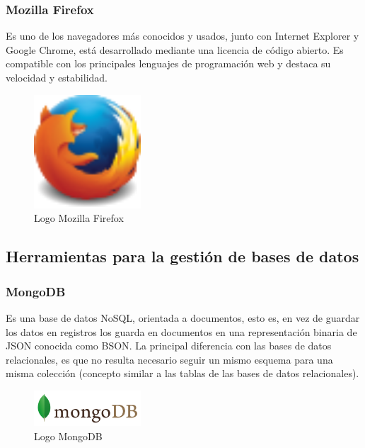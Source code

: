 		\subsubsection{Mozilla Firefox}		
		Es uno de los navegadores más conocidos y usados, junto con Internet Explorer y Google Chrome, está desarrollado mediante una licencia de código abierto.
		Es compatible con los principales lenguajes de programación web y destaca su velocidad y estabilidad.

		\begin{figure}[H]
		\centering
		\includegraphics[width=40mm, fbox={\fboxrule} 4mm]{images/04-metodo/38-firefox_logo}
		\caption{Logo Mozilla Firefox}
		\label{fig:firefox-logo}
		\end{figure}
		
	\subsection{Herramientas para la gestión de bases de datos}
		\subsubsection{MongoDB}
		Es una base de datos NoSQL, orientada a documentos, esto es, en vez de guardar los datos en registros los guarda en documentos en una representación binaria de \ac{JSON} conocida como \ac{BSON}. La principal diferencia con las bases de datos relacionales, es que no resulta necesario seguir un mismo esquema para una misma colección (concepto similar a las tablas de las bases de datos relacionales).
		
		\begin{figure}[H]
		\centering
		\includegraphics[width=40mm, fbox={\fboxrule} 4mm]{images/04-metodo/31-mongodb_logo.png}
		\caption{Logo MongoDB}
		\label{fig:mongodb-logo}
		\end{figure}	
		

